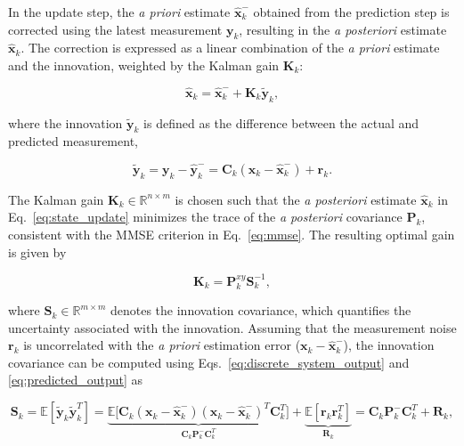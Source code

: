 In the update step, the \emph{a priori} estimate $\hat{\bm{x}}_k^-$ obtained from the prediction step is corrected using the latest measurement $\bm{y}_k$, resulting in the \emph{a posteriori} estimate $\hat{\bm{x}}_k$. The correction is expressed as a linear combination of the \emph{a priori} estimate and the innovation, weighted by the Kalman gain $\bm{K}_k$:

\begin{equation}
	\hat{\bm{x}}_k = \hat{\bm{x}}_k^- + \bm{K}_k \tilde{\bm{y}}_k,
	\label{eq:state_update}
\end{equation}

where the innovation $\tilde{\bm{y}}_k$ is defined as the difference between the actual and predicted measurement,

\begin{equation}
	\tilde{\bm{y}}_k 
	= 
	\bm{y}_k - \hat{\bm{y}}_k^-
	=
	\bm{C}_k(\bm{x}_k-\hat{\bm{x}}_k^-) + \bm{r}_k.
	\label{eq:innovation}
\end{equation}

The Kalman gain $\bm{K}_k \in \mathbb{R}^{n \times m}$ is chosen such that the \emph{a posteriori} estimate $\hat{\bm{x}}_k$ in Eq.~\eqref{eq:state_update} minimizes the trace of the \emph{a posteriori} covariance $\bm{P}_k$, consistent with the MMSE criterion in Eq.~\eqref{eq:mmse}. The resulting optimal gain is given by \cite{Särkkä2013KF}

\begin{equation}
	\bm{K}_k = \bm{P}_k^{xy} \bm{S}_k^{-1}, 
	\label{eq:kalman_gain}
\end{equation}

where $\bm{S}_k \in \mathbb{R}^{m \times m}$ denotes the innovation covariance, which quantifies the uncertainty associated with the innovation. Assuming that the measurement noise $\bm{r}_k$ is uncorrelated with the \emph{a priori} estimation error ($\bm{x}_k - \hat{\bm{x}}_k^-$), the innovation covariance can be computed using Eqs.~\eqref{eq:discrete_system_output} and \eqref{eq:predicted_output} as

\begin{equation}
	\bm{S}_k 
	= 
	\mathbb{E}[\tilde{\bm{y}}_k \tilde{\bm{y}}_k^T]
	=
	\underbrace{\mathbb{E}\big[\bm{C}_k(\bm{x}_k-\hat{\bm{x}}_k^-)(\bm{x}_k-\hat{\bm{x}}_k^-)^T\bm{C}_k^T\big]}_{\bm{C}_k \bm{P}_k^- \bm{C}_k^T}
	+
	\underbrace{\mathbb{E}[\bm{r}_k \bm{r}_k^T]}_{\bm{R}_k}
	=
	\bm{C}_k \bm{P}_k^- \bm{C}_k^T + \bm{R}_k,
	\label{eq:innovation_cov}
\end{equation}

